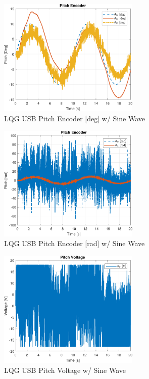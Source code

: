 \documentclass[fontsize=11pt, %
                             paper=letter, %
                             openany, %
                             captions=tableheading,
                             index=totoc,
                             hyperref]{labbook}
\begin{document}
\begin{addmargin}[0cm]{0cm}
\begin{figure}[h]
  \centering
  \includegraphics[width=0.6\textwidth]{figs/matlab/LQG/LQG_USB/Pitch_Pos_deg_LQG_USB_SIN}
  \caption{LQG USB Pitch Encoder [deg] w/ Sine Wave}
  \label{fig:Pitch_Pos_deg_LQG_USB_SIN}
\end{figure}

\begin{figure}[h]
  \centering
  \includegraphics[width=0.6\textwidth]{figs/matlab/LQG/LQG_USB/Pitch_Pos_Rad_LQG_USB_SIN}
  \caption{LQG USB Pitch Encoder [rad] w/ Sine Wave}
  \label{fig:Pitch_Pos_Rad_LQG_USB_SIN}
\end{figure}

\begin{figure}[h]
  \centering
  \includegraphics[width=0.6\textwidth]{figs/matlab/LQG/LQG_USB/Pitch_Volt_LQG_USB_SIN}
  \caption{LQG USB Pitch Voltage w/ Sine Wave}
  \label{fig:Pitch_Volt_LQG_USB_SIN}
\end{figure}


\end{addmargin}
\end{document}

